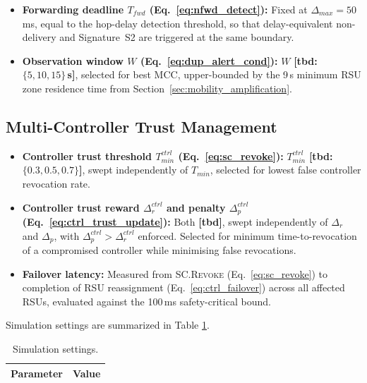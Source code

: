 \documentclass[12pt, a4paper]{report}
\begin{document}
{{\begin{itemize}
    \item \textbf{Forwarding deadline $T_{fwd}$
    (Eq.~\ref{eq:nfwd_detect}):}
    Fixed at $\Delta_{max} = 50$\,ms, equal to
    the hop-delay detection threshold, so that
    delay-equivalent non-delivery and Signature~S2
    are triggered at the same boundary.

    \item \textbf{Observation window $W$
    (Eq.~\ref{eq:dup_alert_cond}):}
    $W$ \textbf{[tbd: $\{5, 10, 15\}$\,s]},
    selected for best MCC, upper-bounded by the
    9\,s minimum RSU zone residence time from
    Section~\ref{sec:mobility_amplification}.
\end{itemize}


\subsection{Multi-Controller Trust Management}
\begin{itemize}
    \item \textbf{Controller trust threshold
    $T_{min}^{ctrl}$ (Eq.~\ref{eq:sc_revoke}):}
    $T_{min}^{ctrl}$ \textbf{[tbd:
    $\{0.3, 0.5, 0.7\}$]}, swept independently
    of $T_{min}$, selected for lowest false
    controller revocation rate.

    \item \textbf{Controller trust reward
    $\Delta_r^{ctrl}$ and penalty
    $\Delta_p^{ctrl}$
    (Eq.~\ref{eq:ctrl_trust_update}):}
    Both \textbf{[tbd]}, swept independently
    of $\Delta_r$ and $\Delta_p$, with
    $\Delta_p^{ctrl} > \Delta_r^{ctrl}$ enforced.
    Selected for minimum time-to-revocation of a
    compromised controller while minimising false
    revocations.

    \item \textbf{Failover latency:}
    Measured from \textsc{SC.Revoke}
    (Eq.~\ref{eq:sc_revoke}) to completion of RSU
    reassignment (Eq.~\ref{eq:ctrl_failover})
    across all affected RSUs, evaluated against
    the 100\,ms safety-critical bound.
\end{itemize}

Simulation settings are summarized in Table \ref{simulation_table}.

\begin{longtable}{|m{5.0cm}|m{9.0cm}|}
\caption{Simulation settings.}
\label{simulation_table}\\
\hline
\textbf{Parameter} & \textbf{Value} \\
\hline
\endfirsthead


\end{longtable}}}
\end{document}

